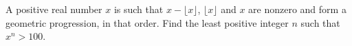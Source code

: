 A positive real number $x$ is such that $x-\lfloor x\rfloor$, $\lfloor x\rfloor$ and $x$ are nonzero and form a geometric progression, in that order. Find the least positive integer $n$ such that $x^n>100$.
